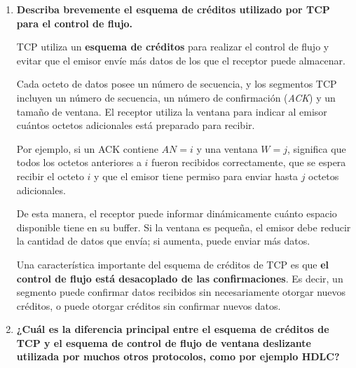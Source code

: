 \documentclass[11pt,a4paper]{article}
\begin{document}
\begin{enumerate}[label=20.\arabic*, start=1, itemsep=0.3cm]
\begin{itemize}
    \item \textbf{Multiplexación hacia abajo (downward multiplexing):} una única conexión de transporte utiliza varias conexiones de red. Los datos pueden distribuirse entre estas conexiones, lo que permite aprovecharlas simultáneamente y puede mejorar el rendimiento.

    \end{itemize}

    En resumen la multiplexación permite aprovechar mejor los recursos de la red, ya sea haciendo que varias conexiones de transporte compartan una misma conexión de red, o utilizando varias conexiones de red para una misma conexión de transporte.

  \item
    \textbf{Describa brevemente el esquema de créditos utilizado por TCP para el control de flujo.}

    TCP utiliza un \textbf{esquema de créditos} para realizar el control de flujo y evitar que el emisor envíe más datos de los que el receptor puede almacenar.

    Cada octeto de datos posee un número de secuencia, y los segmentos TCP incluyen un número de secuencia, un número de confirmación (\textit{ACK}) y un tamaño de ventana. El receptor utiliza la ventana para indicar al emisor cuántos octetos adicionales está preparado para recibir.

    Por ejemplo, si un ACK contiene \(AN=i\) y una ventana \(W=j\), significa que todos los octetos anteriores a \(i\) fueron recibidos correctamente, que se espera recibir el octeto \(i\) y que el emisor tiene permiso para enviar hasta \(j\) octetos adicionales.

    De esta manera, el receptor puede informar dinámicamente cuánto espacio disponible tiene en su buffer. Si la ventana es pequeña, el emisor debe reducir la cantidad de datos que envía; si aumenta, puede enviar más datos.

    Una característica importante del esquema de créditos de TCP es que \textbf{el control de flujo está desacoplado de las confirmaciones}. Es decir, un segmento puede confirmar datos recibidos sin necesariamente otorgar nuevos créditos, o puede otorgar créditos sin confirmar nuevos datos.

  \item \textbf{¿Cuál es la diferencia principal entre el esquema de créditos de TCP y el esquema de control de flujo de ventana deslizante utilizada por muchos otros protocolos, como por ejemplo HDLC?}


\end{enumerate}
\end{document}
